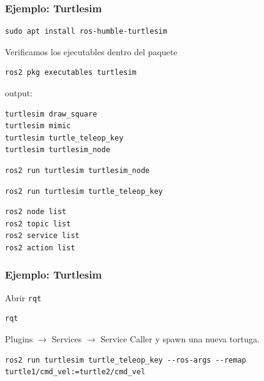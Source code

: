 \begin{frame}[fragile]
    \frametitle{Ejemplo: Turtlesim}
    \footnotesize
\begin{lstlisting}[style=bash]
sudo apt install ros-humble-turtlesim
\end{lstlisting}
    Verificamos los ejecutables dentro del paquete
\begin{lstlisting}[style=bash]
ros2 pkg executables turtlesim
\end{lstlisting}
    output:
\begin{lstlisting}[style=bash]
turtlesim draw_square
turtlesim mimic
turtlesim turtle_teleop_key
turtlesim turtlesim_node
\end{lstlisting}

\begin{lstlisting}[style=bash]
ros2 run turtlesim turtlesim_node
\end{lstlisting}

\begin{lstlisting}[style=bash]
ros2 run turtlesim turtle_teleop_key
\end{lstlisting}
\begin{lstlisting}[style=bash]
ros2 node list
ros2 topic list
ros2 service list
ros2 action list
\end{lstlisting}

\end{frame}

\begin{frame}[fragile]
	\frametitle{Ejemplo: Turtlesim}
    Abrir \lstinline[style=bash]{rqt}
\begin{lstlisting}[style=bash]    
rqt
\end{lstlisting}
	Plugins $\rightarrow$ Services $\rightarrow$ Service Caller y spawn una nueva tortuga.

\footnotesize
\begin{lstlisting}[style=bash]    
ros2 run turtlesim turtle_teleop_key --ros-args --remap turtle1/cmd_vel:=turtle2/cmd_vel
\end{lstlisting}

\end{frame}

